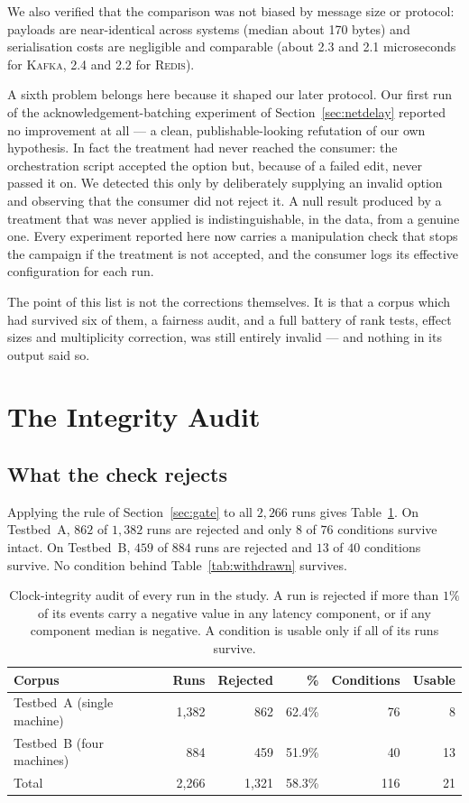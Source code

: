 \documentclass[Afour,sageh,times]{sagej}
\newcommand{\redis}{\textsc{Redis}}
\newcommand{\kafka}{\textsc{Kafka}}
\begin{document}
We also verified that the comparison was not biased by message size or protocol: payloads are
near-identical across systems (median about 170 bytes) and serialisation costs are negligible and
comparable (about 2.3 and 2.1 microseconds for \kafka{}, 2.4 and 2.2 for \redis{}).

A sixth problem belongs here because it shaped our later protocol. Our first run of the
acknowledgement-batching experiment of Section~\ref{sec:netdelay} reported no improvement at all
--- a clean, publishable-looking refutation of our own hypothesis. In fact the treatment had never
reached the consumer: the orchestration script accepted the option but, because of a failed edit,
never passed it on. We detected this only by deliberately supplying an invalid option and
observing that the consumer did not reject it. A null result produced by a treatment that was
never applied is indistinguishable, in the data, from a genuine one. Every experiment reported
here now carries a manipulation check that stops the campaign if the treatment is not accepted,
and the consumer logs its effective configuration for each run.

The point of this list is not the corrections themselves. It is that a corpus which had survived
six of them, a fairness audit, and a full battery of rank tests, effect sizes and multiplicity
correction, was still entirely invalid --- and nothing in its output said so.


\section{The Integrity Audit}
\label{sec:audit}

\subsection{What the check rejects}
\label{sec:auditresults}

Applying the rule of Section~\ref{sec:gate} to all $2{,}266$ runs gives Table~\ref{tab:audit}. On
Testbed~A, $862$ of $1{,}382$ runs are rejected and only $8$ of $76$ conditions survive intact. On
Testbed~B, $459$ of $884$ runs are rejected and $13$ of $40$ conditions survive. No condition
behind Table~\ref{tab:withdrawn} survives.

\begin{table}[htbp]
\centering
\caption{Clock-integrity audit of every run in the study. A run is rejected if more than $1\%$ of
its events carry a negative value in any latency component, or if any component median is
negative. A condition is usable only if all of its runs survive.}
\label{tab:audit}
\begin{tabular}{lrrrrr}
\toprule
Corpus & Runs & Rejected & \% & Conditions & Usable \\
\midrule
Testbed~A (single machine) & 1{,}382 & 862 & 62.4\% & 76 & 8 \\
Testbed~B (four machines)  &   884 & 459 & 51.9\% & 40 & 13 \\
\midrule
Total                      & 2{,}266 & 1{,}321 & 58.3\% & 116 & 21 \\
\bottomrule
\end{tabular}
\end{table}
\end{document}
